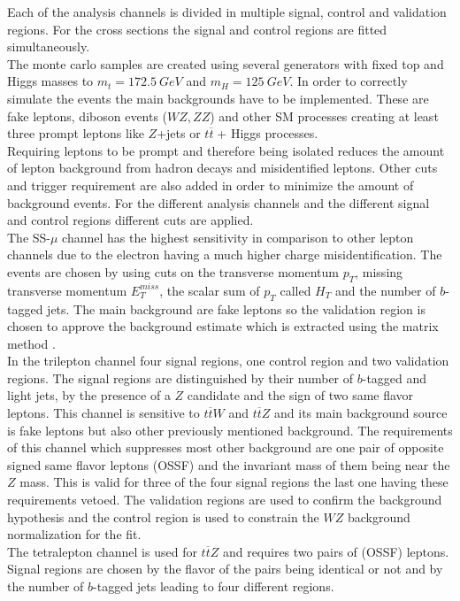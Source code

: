 \documentclass[11pt, twocolumn, a4paper]{article}
\newcommand{\ttbars}{${t \overline{t} \; }$}
\newcommand{\ttW}{{t \overline{t} W }}
\newcommand{\ttZ}{{t \overline{t} Z }}
\begin{document}
Each of the analysis channels is divided in multiple signal, control and validation regions.
For the cross sections the signal and control regions are fitted simultaneously.\\
%
%
The monte carlo samples are created using several generators with fixed top and Higgs masses to $m_t=\SI{172.5}{GeV}$ and $m_H=\SI{125}{GeV}.$
In order to correctly simulate the events the main backgrounds have to be implemented.
These are fake leptons, diboson events ($WZ,ZZ$) and other SM processes creating at least three prompt leptons like $Z$+jets or \ttbars + Higgs processes.\\
\FloatBarrier
%
Requiring leptons to be prompt and therefore being isolated reduces the amount of lepton background from hadron decays and misidentified leptons.
Other cuts and trigger requirement are also added in order to minimize the amount of background events.
For the different analysis channels and the different signal and control regions different cuts are applied.\\
The SS-$\mu$ channel has the highest sensitivity in comparison to other lepton channels due to the electron having a much higher charge misidentification.
The events are chosen by using cuts on the transverse momentum $p_T$, missing transverse momentum $E_T^{miss}$, the scalar sum of $p_T$ called $H_T$ and the number of $b$-tagged jets. 
The main background are fake leptons so the validation region is chosen to approve the background estimate which is extracted using the matrix method \cite{MM}.\\
%
In the trilepton channel four signal regions, one control region and two validation regions.
The signal regions are distinguished by their number of $b$-tagged and light jets, by the presence of a $Z$ candidate and the sign of two same flavor leptons.
This channel is sensitive to $\ttW$ and $\ttZ$ and its main background source is fake leptons but also other previously mentioned background.
The requirements of this channel which suppresses most other background are one pair of opposite signed same flavor leptons (OSSF) and the invariant mass of them being near the $Z$ mass.
This is valid for three of the four signal regions the last one having these requirements vetoed.
The validation regions are used to confirm the background hypothesis and the control region is used to constrain the $WZ$ background normalization for the fit.\\
%
The tetralepton channel is used for $\ttZ$ and requires two pairs of (OSSF) leptons.
Signal regions are chosen by the flavor of the pairs being identical or not and by the number of $b$-tagged jets leading to four different regions.
\end{document}
